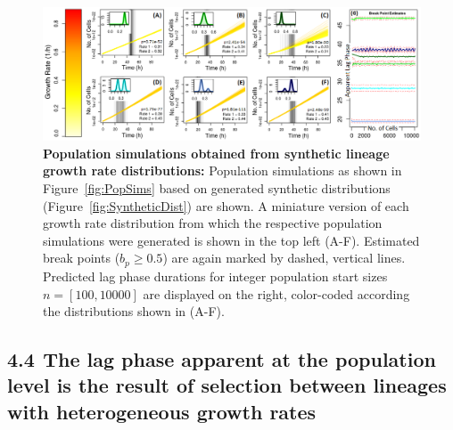 \documentclass{bioinfo}
\begin{document}
\setcounter{figure}{9}
\begin{figure}[ht!]
\vspace{-3em}
\centering
\includegraphics[width=1\linewidth]{Ch1Synthetic.png}
\vspace{-2em}
\caption{\footnotesize{\textbf{Population simulations obtained from synthetic lineage growth rate distributions:} Population simulations as shown in Figure~\ref{fig:PopSims} based on generated synthetic distributions (Figure~\ref{fig:SyntheticDist}) are shown. A miniature version of each growth rate distribution from which the respective population simulations were generated is shown in the top left (A-F). Estimated break points ($b_p\geq 0.5$) are again marked by dashed, vertical lines. Predicted lag phase durations for integer population start sizes $n=[100,10000]$ are displayed on the right, color-coded according the distributions shown in (A-F).}}
\label{fig:Synthetic}
\vspace{-2.5em}
\end{figure}

\vspace{-0.5em}
\subsection*{4.4$\>\>$The lag phase apparent at the population level is the result of selection between lineages with heterogeneous growth rates}

\setcounter{figure}{7}
\end{document}
